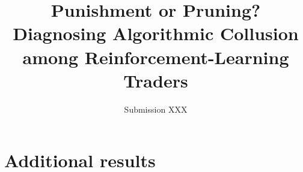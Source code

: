 \documentclass[format=acmsmall, review=false]{acmart}
\title[Punishment or Pruning?]{Punishment or Pruning? Diagnosing Algorithmic Collusion among Reinforcement-Learning Traders}
\author{Submission XXX}
\theoremstyle{acmdefinition}
\newcommand{\ECdeferred}{}
\begin{document}
\begin{titlepage}
\maketitle
\vspace{0.5cm}
\setcounter{tocdepth}{1}
\tableofcontents
\end{titlepage}









\label{lastbodypage}



\appendix
\section{Additional results}
\label{app:additional}
\ECdeferred

\end{document}
